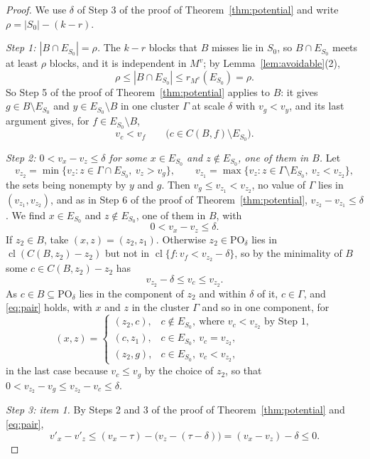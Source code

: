 \documentclass[11pt]{article}
\newcommand{\cl}{\operatorname{cl}}
\newcommand{\PO}{\mathrm{PO}}
\begin{document}
\begin{proof}
We use $\delta$ of Step 3 of the proof of Theorem~\ref{thm:potential} and write
$\rho=|S_0|-(k-r)$.

\emph{Step 1: $|B\cap E_{S_0}|=\rho$.}  The $k-r$ blocks that $B$ misses lie in $S_0$, so
$B\cap E_{S_0}$ meets at least $\rho$ blocks, and it is independent in $M^{v}$; by
Lemma~\ref{lem:avoidable}(2),
\[
  \rho\le|B\cap E_{S_0}|\le r_{M^{v}}(E_{S_0})=\rho.
\]
So Step 5 of the proof of Theorem~\ref{thm:potential} applies to $B$: it gives
$g\in B\setminus E_{S_0}$ and $y\in E_{S_0}\setminus B$ in one cluster $\Gamma$ at
scale $\delta$ with $v_g<v_y$, and its last argument gives, for
$f\in E_{S_0}\setminus B$,
\[
  v_c<v_f\qquad\bigl(c\in C(B,f)\setminus E_{S_0}\bigr).
\]

\emph{Step 2: $0<v_x-v_z\le\delta$ for some $x\in E_{S_0}$ and $z\notin E_{S_0}$, one of them in $B$.}  Let
\[
  v_{z_2}=\min\{v_z:z\in\Gamma\cap E_{S_0},\ v_z>v_g\},\qquad
  v_{z_1}=\max\{v_z:z\in\Gamma\setminus E_{S_0},\ v_z<v_{z_2}\},
\]
the sets being nonempty by $y$ and $g$.  Then $v_g\le v_{z_1}<v_{z_2}$, no value
of $\Gamma$ lies in $(v_{z_1},v_{z_2})$, and as in Step 6 of the proof of
Theorem~\ref{thm:potential}, $v_{z_2}-v_{z_1}\le\delta$.  We find $x\in E_{S_0}$ and
$z\notin E_{S_0}$, one of them in $B$, with
\begin{equation}
  0<v_x-v_z\le\delta.
  \label{eq:pair}
\end{equation}
If $z_2\in B$, take $(x,z)=(z_2,z_1)$.  Otherwise $z_2\in\PO_\delta$ lies in
$\cl(C(B,z_2)-z_2)$ but not in $\cl\{f:v_f<v_{z_2}-\delta\}$, so by the minimality
of $B$ some $c\in C(B,z_2)-z_2$ has
\[
  v_{z_2}-\delta\le v_c\le v_{z_2}.
\]
As $c\in B\subseteq\PO_\delta$ lies in the component of $z_2$ and within $\delta$
of it, $c\in\Gamma$, and \eqref{eq:pair} holds, with $x$ and $z$ in the cluster
$\Gamma$ and so in one component, for
\[
  (x,z)=
  \begin{cases}
    (z_2,c),&c\notin E_{S_0},\ \text{where }v_c<v_{z_2}\text{ by Step 1},\\
    (c,z_1),&c\in E_{S_0},\ v_c=v_{z_2},\\
    (z_2,g),&c\in E_{S_0},\ v_c<v_{z_2},
  \end{cases}
\]
in the last case because $v_c\le v_g$ by the choice of $z_2$, so that
$0<v_{z_2}-v_g\le v_{z_2}-v_c\le\delta$.

\emph{Step 3: item 1.}  By Steps 2 and 3 of the proof of
Theorem~\ref{thm:potential} and \eqref{eq:pair},
\[
  v'_x-v'_z\le(v_x-\tau)-\bigl(v_z-(\tau-\delta)\bigr)=(v_x-v_z)-\delta\le0.
\]


\end{proof}
\end{document}
